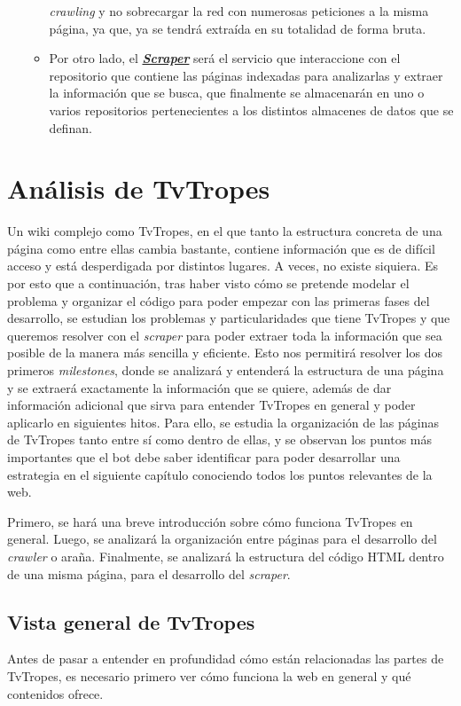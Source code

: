 \begin{itemize}
\begin{itemize}
    \textit{crawling} y no sobrecargar la red con numerosas peticiones a la
    misma página, ya que, ya se tendrá extraída en su totalidad de forma bruta.
    \item Por otro lado, el
    \textbf{\href{https://github.com/jlgallego99/TropesToGo/blob/master/tropestogo/service/scraper/scraper.go}{\textit{Scraper}}}
    será el servicio que interaccione con el repositorio que contiene las
    páginas indexadas para analizarlas y extraer la información que se busca,
    que finalmente se almacenarán en uno o varios repositorios pertenecientes a
    los distintos almacenes de datos que se definan. 
  \end{itemize}
\end{itemize}

\section{Análisis de TvTropes}
Un wiki complejo como TvTropes, en el que tanto la estructura concreta de una
página como entre ellas cambia bastante, contiene información que es de difícil
acceso y está desperdigada por distintos lugares. A veces, no existe siquiera.
Es por esto que a continuación, tras haber visto cómo se pretende modelar el
problema y organizar el código para poder empezar con las primeras fases del
desarrollo, se estudian los problemas y particularidades que tiene TvTropes y
que queremos resolver con el \textit{scraper} para poder extraer toda la
información que sea posible de la manera más sencilla y eficiente. Esto nos
permitirá resolver los dos primeros \textit{milestones}, donde se analizará y
entenderá la estructura de una página y se extraerá exactamente la información
que se quiere, además de dar información adicional que sirva para entender
TvTropes en general y poder aplicarlo en siguientes hitos. Para ello, se estudia
la organización de las páginas de TvTropes tanto entre sí como dentro de ellas,
y se observan los puntos más importantes que el bot debe saber identificar para
poder desarrollar una estrategia en el siguiente capítulo conociendo todos los
puntos relevantes de la web.

Primero, se hará una breve introducción sobre cómo funciona TvTropes en general.
Luego, se analizará la organización entre páginas para el desarrollo del
\textit{crawler} o araña. Finalmente, se analizará la estructura del código HTML
dentro de una misma página, para el desarrollo del \textit{scraper}.

\subsection{Vista general de TvTropes}
Antes de pasar a entender en profundidad cómo están relacionadas las partes de
TvTropes, es necesario primero ver cómo funciona la web en general y qué
contenidos ofrece.

